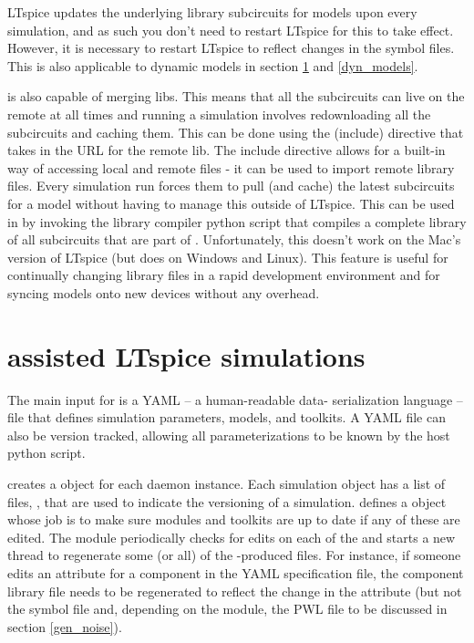 LTspice updates the underlying library subcircuits for models upon every simulation,
and as such you don't need to restart LTspice for this to take effect. However,
it is necessary to restart LTspice to reflect changes in the symbol files. This is 
also applicable to  dynamic models in section \ref{sd_models} and \ref{dyn_models}.

 is also capable of merging libs. This means that all the subcircuits can live
on the remote at all times and running a simulation involves redownloading all the 
subcircuits and caching them. This can be done using the  (include) directive that takes
in the URL for the remote lib. The include directive allows for a built-in way of accessing local
and remote files - it can be used to import remote library files. Every simulation run forces
them to pull (and cache) the latest subcircuits for a model without having to manage this
outside of LTspice. This can be used in  by invoking the library compiler python script
that compiles a complete library of all subcircuits that are part of .
Unfortunately, this doesn't work on the Mac's version of LTspice  (but does on
Windows and Linux). This feature is useful for continually changing library files in 
a rapid development environment and for syncing models onto new devices without 
any overhead.



\section{ assisted LTspice simulations}\label{sd_models}

The main input for  is a YAML -- a human-readable data-
serialization language -- file that defines simulation parameters,  models, and
toolkits. A YAML file can also be version tracked, allowing all parameterizations to be known by the host
python script. 

 creates a  object for each daemon instance. Each simulation
object has a list of files, , that are used to indicate the versioning
of a simulation.  defines a  object whose job is to make sure
 modules and toolkits are up to date if any of these 
are edited. 
The  module periodically checks for edits on each of the 
and starts a new thread to regenerate some (or all) of the -produced files.
For instance, if someone edits an attribute for a component in the YAML specification file, 
the component library file needs to be regenerated to reflect the change in the attribute (but not the symbol file and, depending on the module, the PWL file to be discussed in section \ref{gen_noise}).

